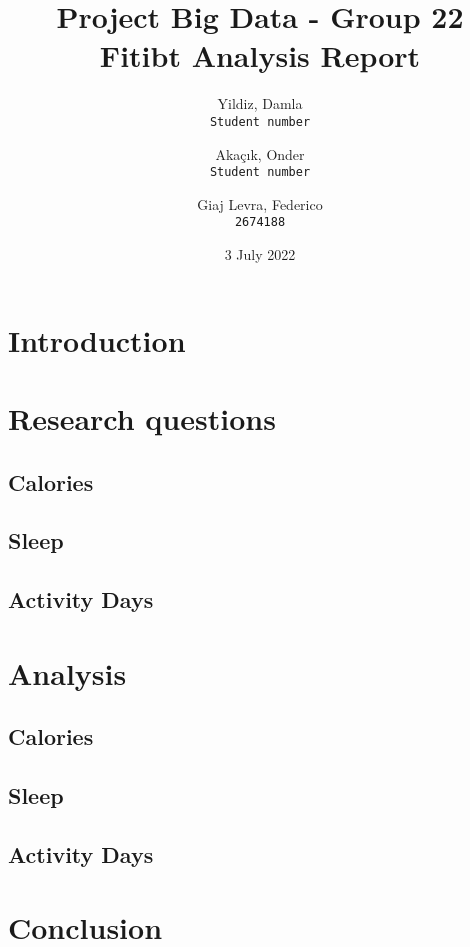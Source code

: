 \documentclass{report}
\title{Project Big Data - Group 22\\[2ex]
Fitibt Analysis Report}
\author{
  Yildiz, Damla\\
  \texttt{Student number}
  \and
  Akaçık, Onder\\
  \texttt{Student number}
  \and
  Giaj Levra, Federico\\
  \texttt{2674188}
}
\date{3 July 2022}
\begin{document}
\maketitle
\tableofcontents
\section{Introduction}
\section{Research questions}
\subsection{Calories}
\subsection{Sleep}
\subsection{Activity Days}

\section{Analysis}
\subsection{Calories}
\subsection{Sleep}
\subsection{Activity Days}

\section{Conclusion}



 
 
\end{document}
